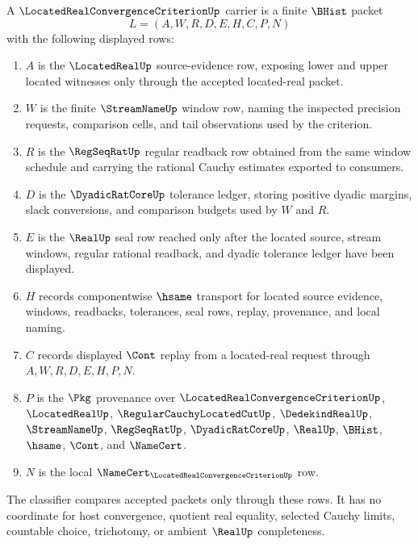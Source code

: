 \begin{definition}
\label{def:located-real-convergence-criterion-carrier}
A $\LocatedRealConvergenceCriterionUp$ carrier is a finite $\BHist$ packet
$$
L=(A,W,R,D,E,H,C,P,N)
$$
with the following displayed rows:
\begin{enumerate}
\item $A$ is the $\LocatedRealUp$ source-evidence row, exposing lower and upper located witnesses only through the accepted located-real packet.
\item $W$ is the finite $\StreamNameUp$ window row, naming the inspected precision requests, comparison cells, and tail observations used by the criterion.
\item $R$ is the $\RegSeqRatUp$ regular readback row obtained from the same window schedule and carrying the rational Cauchy estimates exported to consumers.
\item $D$ is the $\DyadicRatCoreUp$ tolerance ledger, storing positive dyadic margins, slack conversions, and comparison budgets used by $W$ and $R$.
\item $E$ is the $\RealUp$ seal row reached only after the located source, stream windows, regular rational readback, and dyadic tolerance ledger have been displayed.
\item $H$ records componentwise $\hsame$ transport for located source evidence, windows, readbacks, tolerances, seal rows, replay, provenance, and local naming.
\item $C$ records displayed $\Cont$ replay from a located-real request through $A,W,R,D,E,H,P,N$.
\item $P$ is the $\Pkg$ provenance over $\LocatedRealConvergenceCriterionUp$, $\LocatedRealUp$, $\RegularCauchyLocatedCutUp$, $\DedekindRealUp$, $\StreamNameUp$, $\RegSeqRatUp$, $\DyadicRatCoreUp$, $\RealUp$, $\BHist$, $\hsame$, $\Cont$, and $\NameCert$.
\item $N$ is the local $\NameCert_{\LocatedRealConvergenceCriterionUp}$ row.
\end{enumerate}
The classifier compares accepted packets only through these rows. It has no coordinate for host convergence, quotient real equality, selected Cauchy limits, countable choice, trichotomy, or ambient $\RealUp$ completeness.
\end{definition}

